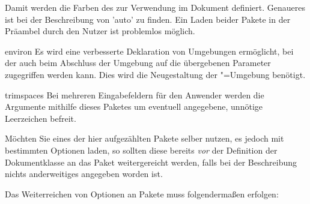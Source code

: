 \begin{packages}
  Damit werden die Farben des \CDs zur Verwendung im Dokument definiert. 
  Genaueres ist bei der Beschreibung von 'auto' zu finden. 
  Ein Laden beider Pakete in der  Präambel durch den Nutzer ist problemlos 
  möglich.
\item[environ]
  Es wird eine verbesserte Deklaration von Umgebungen ermöglicht, bei der auch 
  beim Abschluss der Umgebung auf die übergebenen Parameter zugegriffen werden 
  kann. Dies wird die Neugestaltung der "=Umgebung 
  benötigt.
\item[trimspaces]
  Bei mehreren Eingabefeldern für den Anwender werden die Argumente mithilfe 
  dieses Paketes um eventuell angegebene, unnötige Leerzeichen befreit.
\end{packages}
%
Möchten Sie eines der hier aufgezählten Pakete selber nutzen, es jedoch mit 
bestimmten Optionen laden, so sollten diese bereits \emph{vor} der Definition 
der Dokumentklasse an das Paket weitergereicht werden, falls bei der 
Beschreibung nichts anderweitiges angegeben worden ist.
%
\begin{Example}
Das Weiterreichen von Optionen an Pakete muss folgendermaßen erfolgen:
\end{Example}



